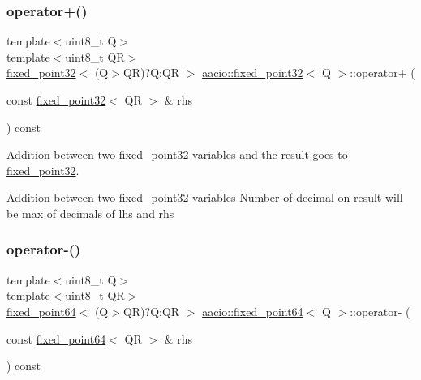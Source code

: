 \subsubsection{\texorpdfstring{operator+()}{operator+()}\hspace{0.1cm}{\footnotesize\ttfamily [2/2]}}
{\footnotesize\ttfamily template$<$uint8\+\_\+t Q$>$ \\
template$<$uint8\+\_\+t QR$>$ \\
\mbox{\hyperlink{structaacio_1_1fixed__point32}{fixed\+\_\+point32}}$<$ (Q$>$QR)?Q\+:\+QR $>$ \mbox{\hyperlink{structaacio_1_1fixed__point32}{aacio\+::fixed\+\_\+point32}}$<$ Q $>$\+::operator+ (\begin{DoxyParamCaption}\item[{const \mbox{\hyperlink{structaacio_1_1fixed__point32}{fixed\+\_\+point32}}$<$ QR $>$ \&}]{rhs }\end{DoxyParamCaption}) const}



Addition between two \mbox{\hyperlink{structaacio_1_1fixed__point32}{fixed\+\_\+point32}} variables and the result goes to \mbox{\hyperlink{structaacio_1_1fixed__point32}{fixed\+\_\+point32}}. 

Addition between two \mbox{\hyperlink{structaacio_1_1fixed__point32}{fixed\+\_\+point32}} variables Number of decimal on result will be max of decimals of lhs and rhs \mbox{\label{group__fixedpoint_ga4adb183ccf49ea8a378585c373b9902a}} 
\subsubsection{\texorpdfstring{operator-\/()}{operator-()}\hspace{0.1cm}{\footnotesize\ttfamily [1/2]}}
{\footnotesize\ttfamily template$<$uint8\+\_\+t Q$>$ \\
template$<$uint8\+\_\+t QR$>$ \\
\mbox{\hyperlink{structaacio_1_1fixed__point64}{fixed\+\_\+point64}}$<$ (Q$>$QR)?Q\+:\+QR $>$ \mbox{\hyperlink{structaacio_1_1fixed__point64}{aacio\+::fixed\+\_\+point64}}$<$ Q $>$\+::operator-\/ (\begin{DoxyParamCaption}\item[{const \mbox{\hyperlink{structaacio_1_1fixed__point64}{fixed\+\_\+point64}}$<$ QR $>$ \&}]{rhs }\end{DoxyParamCaption}) const}




